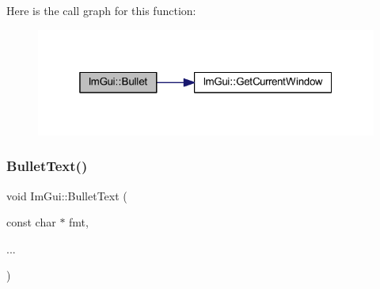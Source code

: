 Here is the call graph for this function\+:
\nopagebreak
\begin{figure}[H]
\begin{center}
\leavevmode
\includegraphics[width=319pt]{namespace_im_gui_ae2d22212681556d2c2398dfd152f3121_cgraph}
\end{center}
\end{figure}
\mbox{\label{namespace_im_gui_af8d34d563b17c683943a0fa7bf5807bc}} 
\subsubsection{\texorpdfstring{Bullet\+Text()}{BulletText()}}
{\footnotesize\ttfamily void Im\+Gui\+::\+Bullet\+Text (\begin{DoxyParamCaption}\item[{const char $\ast$}]{fmt,  }\item[{}]{... }\end{DoxyParamCaption})}

